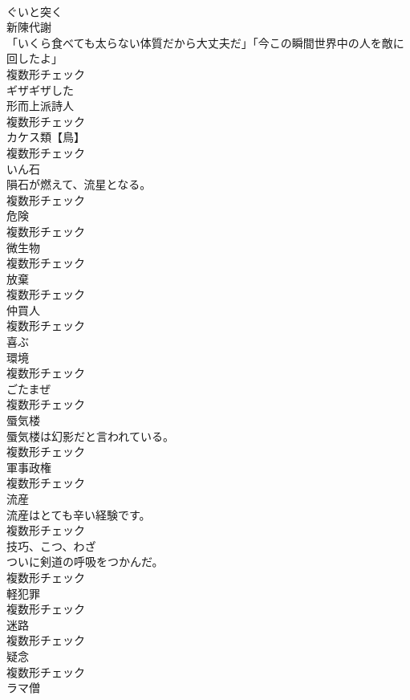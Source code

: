 \documentclass[8pt]{extreport}
\begin{document}
\begin{CJK}{UTF8}{min}
\\	[動詞]	ぐいと突く	
\\	[名詞]	新陳代謝	
\\	「いくら食べても太らない体質だから大丈夫だ」「今この瞬間世界中の人を敵に回したよ」	
\\	複数形チェック
\\	[形容詞]	ギザギザした	
\\	[名詞]	形而上派詩人	
\\	複数形チェック
\\	[名詞]	カケス類【鳥】	
\\	複数形チェック
\\	[名詞]	いん石	
\\	隕石が燃えて、流星となる。	
\\	複数形チェック
\\	[名詞]	危険	
\\	複数形チェック
\\	[名詞]	微生物	
\\	複数形チェック
\\	[名詞]	放棄	
\\	複数形チェック
\\	[名詞]	仲買人	
\\	複数形チェック
\\	[形容詞]	喜ぶ	
\\	[名詞]	環境	
\\	複数形チェック
\\	[名詞]	ごたまぜ	
\\	複数形チェック
\\	[名詞]	蜃気楼	
\\	蜃気楼は幻影だと言われている。	
\\	複数形チェック
\\	[名詞]	軍事政権	
\\	複数形チェック
\\	[名詞]	流産	
\\	流産はとても辛い経験です。	
\\	複数形チェック
\\	[名詞]	技巧、こつ、わざ	
\\	ついに剣道の呼吸をつかんだ。	
\\	複数形チェック
\\	[名詞]	軽犯罪	
\\	複数形チェック
\\	[名詞]	迷路	
\\	複数形チェック
\\	[名詞]	疑念	
\\	複数形チェック
\\	[名詞]	ラマ僧	

\end{CJK}
\end{document}
